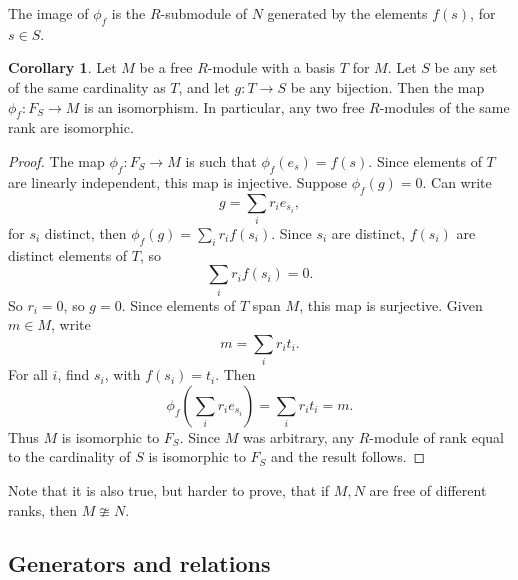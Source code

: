 \documentclass{article}
\newcommand{\rb}[1]{\left( #1 \right)}
\theoremstyle{definition}\newtheorem{definition}{Definition}[subsection]
\theoremstyle{definition}\newtheorem{remark}[definition]{Remark}
\theoremstyle{definition}\newtheorem*{example}{Example}
\theoremstyle{definition}\newtheorem*{note}{Note}
\newtheorem{corollary}[definition]{Corollary}
\begin{document}
The image of $ \phi_f $ is the $ R $-submodule of $ N $ generated by the elements $ f\rb{s} $, for $ s \in S $.

\begin{corollary}
Let $ M $ be a free $ R $-module with a basis $ T $ for $ M $. Let $ S $ be any set of the same cardinality as $ T $, and let $ g : T \to S $ be any bijection. Then the map $ \phi_f : F_S \to M $ is an isomorphism. In particular, any two free $ R $-modules of the same rank are isomorphic.
\end{corollary}

\begin{proof}
The map $ \phi_f : F_S \to M $ is such that $ \phi_f\rb{e_s} = f\rb{s} $. Since elements of $ T $ are linearly independent, this map is injective. Suppose $ \phi_f\rb{g} = 0 $. Can write
$$ g = \sum_i r_ie_{s_i}, $$
for $ s_i $ distinct, then $ \phi_f\rb{g} = \sum_i r_if\rb{s_i} $. Since $ s_i $ are distinct, $ f\rb{s_i} $ are distinct elements of $ T $, so
$$ \sum_i r_if\rb{s_i} = 0. $$
So $ r_i = 0 $, so $ g = 0 $. Since elements of $ T $ span $ M $, this map is surjective. Given $ m \in M $, write
$$ m = \sum_i r_it_i. $$
For all $ i $, find $ s_i $, with $ f\rb{s_i} = t_i $. Then
$$ \phi_f\rb{\sum_i r_ie_{s_i}} = \sum_i r_it_i = m. $$
Thus $ M $ is isomorphic to $ F_S $. Since $ M $ was arbitrary, any $ R $-module of rank equal to the cardinality of $ S $ is isomorphic to $ F_S $ and the result follows.
\end{proof}

Note that it is also true, but harder to prove, that if $ M, N $ are free of different ranks, then $ M \ncong N $.


\subsection{Generators and relations}
\end{document}
